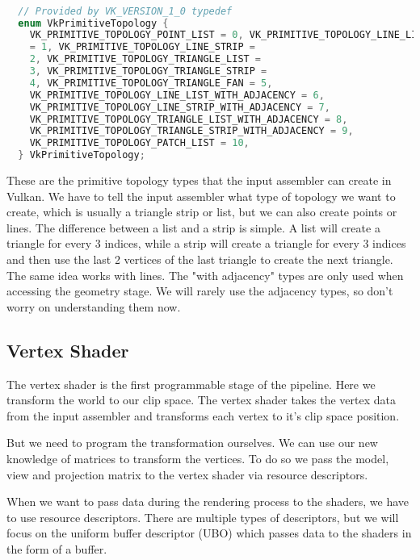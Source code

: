 \documentclass[12pt]{report} \usepackage{preamble}
\begin{document}
\newpage

\begin{lstlisting}[language=C++] 

  // Provided by VK_VERSION_1_0 typedef
  enum VkPrimitiveTopology {
    VK_PRIMITIVE_TOPOLOGY_POINT_LIST = 0, VK_PRIMITIVE_TOPOLOGY_LINE_LIST
    = 1, VK_PRIMITIVE_TOPOLOGY_LINE_STRIP =
    2, VK_PRIMITIVE_TOPOLOGY_TRIANGLE_LIST =
    3, VK_PRIMITIVE_TOPOLOGY_TRIANGLE_STRIP =
    4, VK_PRIMITIVE_TOPOLOGY_TRIANGLE_FAN = 5,
    VK_PRIMITIVE_TOPOLOGY_LINE_LIST_WITH_ADJACENCY = 6,
    VK_PRIMITIVE_TOPOLOGY_LINE_STRIP_WITH_ADJACENCY = 7,
    VK_PRIMITIVE_TOPOLOGY_TRIANGLE_LIST_WITH_ADJACENCY = 8,
    VK_PRIMITIVE_TOPOLOGY_TRIANGLE_STRIP_WITH_ADJACENCY = 9,
    VK_PRIMITIVE_TOPOLOGY_PATCH_LIST = 10,
  } VkPrimitiveTopology; 
  \end{lstlisting} \cite{vulkan-spec-primitive-topology}

These are the primitive topology types that the input assembler can
create in Vulkan.  We have to tell the input assembler what type of
topology we want to create, which is usually a triangle strip or list,
but we can also create points or lines.  The difference between a list
and a strip is simple. A list will create a triangle for every 3 indices,
while a strip will create a triangle for every 3 indices and then use
the last 2 vertices of the last triangle to create the next triangle.
The same idea works with lines. The "with adjacency" types are only
used when accessing the geometry stage. We will rarely use
the adjacency types, so don't worry on understanding them now. \cite{vulkan-spec-primitive-topology}

\subsection{Vertex Shader}

The vertex shader is the first programmable stage of the pipeline.
Here we transform the world to our clip space. The vertex shader takes
the vertex data from the input assembler and transforms each vertex
to it's clip space position. \cite{vulkan-tutorial-shader-modules}

But we need to program the transformation ourselves. We can use our new
knowledge of matrices to transform the vertices. To do so we pass the
model, view and projection matrix to the vertex shader via resource descriptors.

When we want to pass data during the rendering process to the shaders,
we have to use resource descriptors. There are multiple types of descriptors, but we will
focus on the uniform buffer descriptor (UBO) which passes data to the shaders
in the form of a buffer.
\end{document}
